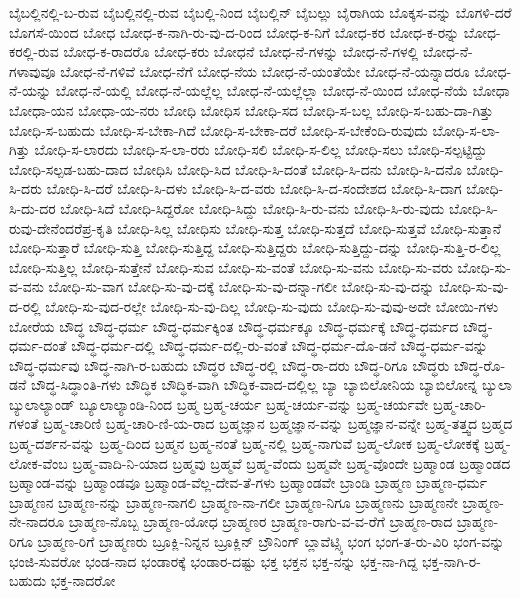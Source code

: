 {ಬೈಬಲ್ಲಿನಲ್ಲಿ-ಬ-ರುವ
ಬೈಬಲ್ಲಿನಲ್ಲಿ-ರುವ
ಬೈಬಲ್ಲಿ-ನಿಂದ
ಬೈಬಲ್ಲಿನ್
ಬೈಬಲ್ಲು
ಬೈರಾಗಿಯ
ಬೊಕ್ಕಸ-ವನ್ನು
ಬೊಗಳಿ-ದರೆ
ಬೊಗಸೆ-ಯಿಂದ
ಬೋಧ
ಬೋಧ-ಕ-ನಾಗಿ-ರು-ವು-ದ-ರಿಂದ
ಬೋಧ-ಕ-ನಿಗೆ
ಬೋಧ-ಕರ
ಬೋಧ-ಕ-ರನ್ನು
ಬೋಧ-ಕರಲ್ಲಿ-ರುವ
ಬೋಧ-ಕ-ರಾದರೊ
ಬೋಧ-ಕರು
ಬೋಧನೆ
ಬೋಧ-ನೆ-ಗಳನ್ನು
ಬೋಧ-ನೆ-ಗಳಲ್ಲಿ
ಬೋಧ-ನೆ-ಗಳಾವುವೂ
ಬೋಧ-ನೆ-ಗಳಿವೆ
ಬೋಧ-ನೆಗೆ
ಬೋಧ-ನೆಯ
ಬೋಧ-ನೆ-ಯಂತೆಯೇ
ಬೋಧ-ನೆ-ಯನ್ನಾದರೂ
ಬೋಧ-ನೆ-ಯನ್ನು
ಬೋಧ-ನೆ-ಯಲ್ಲಿ
ಬೋಧ-ನೆ-ಯಲ್ಲೆಲ್ಲ
ಬೋಧ-ನೆ-ಯಲ್ಲೆಲ್ಲಾ
ಬೋಧ-ನೆ-ಯಿಂದ
ಬೋಧ-ನೆಯೆ
ಬೋಧಾ
ಬೋಧಾ-ಯನ
ಬೋಧಾ-ಯ-ನರು
ಬೋಧಿ
ಬೋಧಿಸ
ಬೋಧಿ-ಸದ
ಬೋಧಿ-ಸ-ಬಲ್ಲ
ಬೋಧಿ-ಸ-ಬಹು-ದಾ-ಗಿತ್ತು
ಬೋಧಿ-ಸ-ಬಹುದು
ಬೋಧಿ-ಸ-ಬೇಕಾ-ಗಿದೆ
ಬೋಧಿ-ಸ-ಬೇಕಾ-ದರೆ
ಬೋಧಿ-ಸ-ಬೇಕೆಂದಿ-ರುವುದು
ಬೋಧಿ-ಸ-ಲಾ-ಗಿತ್ತು
ಬೋಧಿ-ಸ-ಲಾರದು
ಬೋಧಿ-ಸ-ಲಾ-ರರು
ಬೋಧಿ-ಸಲಿ
ಬೋಧಿ-ಸ-ಲಿಲ್ಲ
ಬೋಧಿ-ಸಲು
ಬೋಧಿ-ಸಲ್ಪಟ್ಟಿದ್ದು
ಬೋಧಿ-ಸಲ್ಪಡ-ಬಹು-ದಾದ
ಬೋಧಿಸಿ
ಬೋಧಿ-ಸಿದ
ಬೋಧಿ-ಸಿ-ದಂತೆ
ಬೋಧಿ-ಸಿ-ದನು
ಬೋಧಿ-ಸಿ-ದನೊ
ಬೋಧಿ-ಸಿ-ದರು
ಬೋಧಿ-ಸಿ-ದರೆ
ಬೋಧಿ-ಸಿ-ದಳು
ಬೋಧಿ-ಸಿ-ದ-ವರು
ಬೋಧಿ-ಸಿ-ದ-ಸಂದೇಶದ
ಬೋಧಿ-ಸಿ-ದಾಗ
ಬೋಧಿ-ಸಿ-ದು-ದರ
ಬೋಧಿ-ಸಿದೆ
ಬೋಧಿ-ಸಿದ್ದರೋ
ಬೋಧಿ-ಸಿದ್ದು
ಬೋಧಿ-ಸಿ-ರು-ವನು
ಬೋಧಿ-ಸಿ-ರು-ವುದು
ಬೋಧಿ-ಸಿ-ರುವು-ದೇನೆಂದರೆಪ್ರ-ಕೃತಿ
ಬೋಧಿ-ಸಿಲ್ಲ
ಬೋಧಿಸು
ಬೋಧಿ-ಸುತ್ತ
ಬೋಧಿ-ಸುತ್ತದೆ
ಬೋಧಿ-ಸುತ್ತವೆ
ಬೋಧಿ-ಸುತ್ತಾನೆ
ಬೋಧಿ-ಸುತ್ತಾರೆ
ಬೋಧಿ-ಸುತ್ತಿ
ಬೋಧಿ-ಸುತ್ತಿದ್ದ
ಬೋಧಿ-ಸುತ್ತಿದ್ದರು
ಬೋಧಿ-ಸುತ್ತಿದ್ದು-ದನ್ನು
ಬೋಧಿ-ಸುತ್ತಿ-ರ-ಲಿಲ್ಲ
ಬೋಧಿ-ಸುತ್ತಿಲ್ಲ
ಬೋಧಿ-ಸುತ್ತೇನೆ
ಬೋಧಿ-ಸುವ
ಬೋಧಿ-ಸು-ವಂತೆ
ಬೋಧಿ-ಸು-ವನು
ಬೋಧಿ-ಸು-ವರು
ಬೋಧಿ-ಸು-ವ-ವನು
ಬೋಧಿ-ಸು-ವಾಗ
ಬೋಧಿ-ಸು-ವು-ದಕ್ಕೆ
ಬೋಧಿ-ಸು-ವು-ದನ್ನಾ-ಗಲೀ
ಬೋಧಿ-ಸು-ವು-ದನ್ನು
ಬೋಧಿ-ಸು-ವು-ದ-ರಲ್ಲಿ
ಬೋಧಿ-ಸು-ವುದ-ರಲ್ಲೇ
ಬೋಧಿ-ಸು-ವು-ದಿಲ್ಲ
ಬೋಧಿ-ಸು-ವುದು
ಬೋಧಿ-ಸು-ವುವು-ಅದೇ
ಬೋಯಿ-ಗಳು
ಬೋರೆಯ
ಬೌದ್ಧ
ಬೌದ್ಧ-ಧರ್ಮ
ಬೌದ್ಧ-ಧರ್ಮಕ್ಕಿಂತ
ಬೌದ್ಧ-ಧರ್ಮಕ್ಕೂ
ಬೌದ್ಧ-ಧರ್ಮಕ್ಕೆ
ಬೌದ್ಧ-ಧರ್ಮದ
ಬೌದ್ಧ-ಧರ್ಮ-ದಂತೆ
ಬೌದ್ಧ-ಧರ್ಮ-ದಲ್ಲಿ
ಬೌದ್ಧ-ಧರ್ಮ-ದಲ್ಲಿ-ರು-ವಂತೆ
ಬೌದ್ಧ-ಧರ್ಮ-ದೊ-ಡನೆ
ಬೌದ್ಧ-ಧರ್ಮ-ವನ್ನು
ಬೌದ್ಧ-ಧರ್ಮವು
ಬೌದ್ಧ-ನಾಗಿ-ರ-ಬಹುದು
ಬೌದ್ಧರ
ಬೌದ್ಧ-ರಲ್ಲಿ
ಬೌದ್ಧ-ರಾ-ದರು
ಬೌದ್ಧ-ರಿಗೂ
ಬೌದ್ಧರು
ಬೌದ್ಧ-ರೊ-ಡನೆ
ಬೌದ್ಧ-ಸಿದ್ಧಾಂತಿ-ಗಳು
ಬೌದ್ಧಿಕ
ಬೌದ್ಧಿಕ-ವಾಗಿ
ಬೌದ್ಧಿಕ-ವಾದ-ದಲ್ಲಿಲ್ಲ
ಬ್ಯಾ
ಬ್ಯಾಬಿಲೋನಿಯ
ಬ್ಯಾಬಿಲೋನ್ನ
ಬ್ಯುಲಾ
ಬ್ಯುಲಾಲ್ಯಾಂಡ್
ಬ್ಯೂಲಾಲ್ಯಾಂಡಿ-ನಿಂದ
ಬ್ರಹ್ಮ
ಬ್ರಹ್ಮ-ಚರ್ಯ
ಬ್ರಹ್ಮ-ಚರ್ಯ-ವನ್ನು
ಬ್ರಹ್ಮ-ಚರ್ಯವೇ
ಬ್ರಹ್ಮ-ಚಾರಿ-ಗಳಂತೆ
ಬ್ರಹ್ಮ-ಚಾರಿಣಿ
ಬ್ರಹ್ಮ-ಚಾರಿ-ಣಿ-ಯ-ರಾದ
ಬ್ರಹ್ಮಜ್ಞಾನ
ಬ್ರಹ್ಮಜ್ಞಾನ-ವನ್ನು
ಬ್ರಹ್ಮಜ್ಞಾನ-ವನ್ನೇ
ಬ್ರಹ್ಮ-ತತ್ತ್ವದ
ಬ್ರಹ್ಮದ
ಬ್ರಹ್ಮ-ದರ್ಶನ-ವನ್ನು
ಬ್ರಹ್ಮ-ದಿಂದ
ಬ್ರಹ್ಮನ
ಬ್ರಹ್ಮ-ನಂತೆ
ಬ್ರಹ್ಮ-ನಲ್ಲಿ
ಬ್ರಹ್ಮ-ನಾಗುವೆ
ಬ್ರಹ್ಮ-ಲೋಕ
ಬ್ರಹ್ಮ-ಲೋಕಕ್ಕೆ
ಬ್ರಹ್ಮ-ಲೋಕ-ವೆಂಬ
ಬ್ರಹ್ಮ-ವಾದಿ-ನಿ-ಯಾದ
ಬ್ರಹ್ಮವು
ಬ್ರಹ್ಮವೆ
ಬ್ರಹ್ಮ-ವೆಂದು
ಬ್ರಹ್ಮವೇ
ಬ್ರಹ್ಮ-ವೊಂದೇ
ಬ್ರಹ್ಮಾಂಡ
ಬ್ರಹ್ಮಾಂಡದ
ಬ್ರಹ್ಮಾಂಡ-ವನ್ನು
ಬ್ರಹ್ಮಾಂಡವೂ
ಬ್ರಹ್ಮಾಂಡ-ವೆಲ್ಲ-ದೇವ-ತೆ-ಗಳು
ಬ್ರಹ್ಮಾಂಡವೇ
ಬ್ರಾಂಡಿ
ಬ್ರಾಹ್ಮಣ
ಬ್ರಾಹ್ಮಣ-ಧರ್ಮ
ಬ್ರಾಹ್ಮಣನ
ಬ್ರಾಹ್ಮಣ-ನನ್ನು
ಬ್ರಾಹ್ಮಣ-ನಾಗಲಿ
ಬ್ರಾಹ್ಮಣ-ನಾ-ಗಲೀ
ಬ್ರಾಹ್ಮಣ-ನಿಗೂ
ಬ್ರಾಹ್ಮಣನು
ಬ್ರಾಹ್ಮಣನೇ
ಬ್ರಾಹ್ಮಣ-ನೇ-ನಾದರೂ
ಬ್ರಾಹ್ಮಣ-ನೊಬ್ಬ
ಬ್ರಾಹ್ಮಣ-ಯೋಧ
ಬ್ರಾಹ್ಮಣರ
ಬ್ರಾಹ್ಮಣ-ರಾಗು-ವ-ವ-ರೆಗೆ
ಬ್ರಾಹ್ಮಣ-ರಾದ
ಬ್ರಾಹ್ಮಣ-ರಿಗೂ
ಬ್ರಾಹ್ಮಣ-ರಿಗೆ
ಬ್ರಾಹ್ಮಣರು
ಬ್ರೂಕ್ಲಿ-ನಿನ್ನನ
ಬ್ರೂಕ್ಲಿನ್
ಬ್ರೌನಿಂಗ್
ಬ್ಲಾವೆಟ್ಸ್ಕಿ
ಭಂಗ
ಭಂಗ-ತ-ರು-ವಿರಿ
ಭಂಗ-ವನ್ನು
ಭಂಜಿ-ಸುವರೋ
ಭಂಡ-ನಾದ
ಭಂಡಾರಕ್ಕೆ
ಭಂಡಾರ-ದಷ್ಟು
ಭಕ್ತ
ಭಕ್ತನ
ಭಕ್ತ-ನನ್ನು
ಭಕ್ತ-ನಾ-ಗಿದ್ದ
ಭಕ್ತ-ನಾಗಿ-ರ-ಬಹುದು
ಭಕ್ತ-ನಾದರೋ
}
